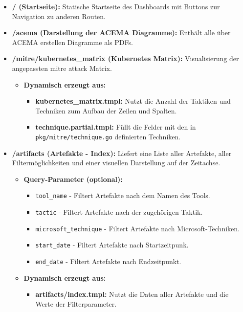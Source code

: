 \begin{itemize}
    \item \textbf{/ (Startseite):} Statische Startseite des Dashboards mit Buttons zur Navigation zu anderen Routen.
    \item \textbf{/acema (Darstellung der ACEMA Diagramme):} Enthält alle über ACEMA erstellen Diagramme als PDFs.
    \item \textbf{/mitre/kubernetes\_matrix (Kubernetes Matrix):} Visualisierung der angepassten \gls{mitre} \gls{attack} Matrix.
          \begin{itemize}
              \item \textbf{Dynamisch erzeugt aus:}
                    \begin{itemize}
                        \item \textbf{kubernetes\_matrix.tmpl:} Nutzt die Anzahl der Taktiken und Techniken zum Aufbau der Zeilen und Spalten.
                        \item \textbf{technique.partial.tmpl:} Füllt die Felder mit den in \\
                        \verb|pkg/mitre/technique.go| definierten Techniken.
                    \end{itemize}
          \end{itemize}

    \item \textbf{/artifacts (Artefakte - Index):} Liefert eine Liste aller Artefakte, aller Filtermöglichkeiten und einer visuellen Darstellung auf der Zeitachse.
          \begin{itemize}
              \item \textbf{Query-Parameter (optional):}
                    \begin{itemize}
                        \item \texttt{tool\_name} - Filtert Artefakte nach dem Namen des Tools.
                        \item \texttt{tactic} - Filtert Artefakte nach der zugehörigen Taktik.
                        \item \texttt{microsoft\_technique} - Filtert Artefakte nach Microsoft-Techniken.
                        \item \texttt{start\_date} - Filtert Artefakte nach Startzeitpunk.
                        \item \texttt{end\_date} - Filtert Artefakte nach Endzeitpunkt.
                    \end{itemize}
              \item \textbf{Dynamisch erzeugt aus:}
                    \begin{itemize}
                        \item \textbf{artifacts/index.tmpl:} Nutzt die Daten aller Artefakte und die Werte der Filterparameter.
                    \end{itemize}
          \end{itemize}


\end{itemize}
